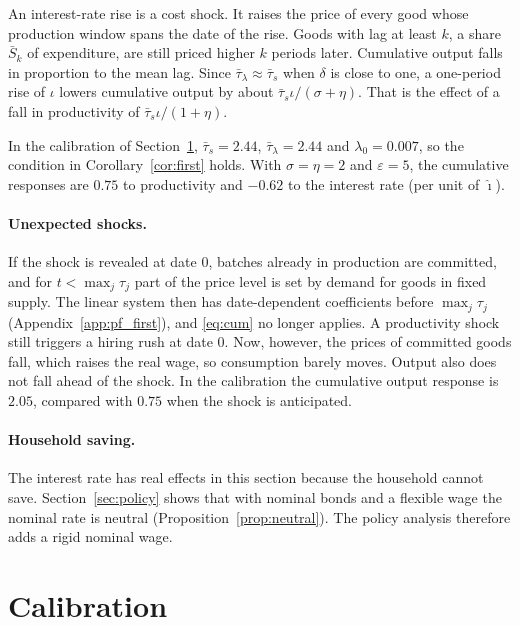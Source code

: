\documentclass[11pt]{article}
\theoremstyle{definition}
\begin{document}
An interest-rate rise is a cost shock. It raises the price of every good whose production window
spans the date of the rise. Goods with lag at least $k$, a share $\bar S_k$ of expenditure, are
still priced higher $k$ periods later. Cumulative output falls in proportion to the mean lag. Since
$\bar\tau_\lambda\approx\bar\tau_s$ when $\delta$ is close to one, a one-period rise of $\iota$
lowers cumulative output by about $\bar\tau_s\iota/(\sigma+\eta)$. That is the effect of a fall
in productivity of $\bar\tau_s\iota/(1+\eta)$.

In the calibration of Section~\ref{sec:calib}, $\bar\tau_s=2.44$, $\bar\tau_\lambda=2.44$ and
$\lambda_0=0.007$, so the condition in Corollary~\ref{cor:first} holds. With $\sigma=\eta=2$ and
$\varepsilon=5$, the cumulative responses are $0.75$ to productivity and $-0.62$ to the interest rate
(per unit of $\hat\imath$).

\paragraph{Unexpected shocks.} If the shock is revealed at date 0, batches already in production
are committed, and for $t<\max_j\tau_j$ part of the price level is set by demand for goods in
fixed supply. The linear system then has date-dependent coefficients before $\max_j\tau_j$
(Appendix~\ref{app:pf_first}), and \eqref{eq:cum} no longer applies. A productivity shock still
triggers a hiring rush at date 0. Now, however, the prices of committed goods fall, which raises
the real wage, so consumption barely moves. Output also does not fall ahead of the shock. In the
calibration the cumulative output response is $2.05$, compared with $0.75$ when the shock is
anticipated.

\paragraph{Household saving.} The interest rate has real effects in this section because the
household cannot save. Section~\ref{sec:policy} shows that with nominal bonds and a flexible wage the
nominal rate is neutral (Proposition~\ref{prop:neutral}). The policy analysis therefore adds a rigid
nominal wage.

\section{Calibration}\label{sec:calib}
\end{document}
